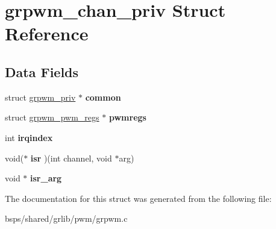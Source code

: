 \hypertarget{structgrpwm__chan__priv}{}\section{grpwm\+\_\+chan\+\_\+priv Struct Reference}
\label{structgrpwm__chan__priv}
\subsection*{Data Fields}
\begin{DoxyCompactItemize}
\item 
\mbox{\label{structgrpwm__chan__priv_a6a0ea36782dfaaa1511485ef8dd62f4c}} 
struct \mbox{\hyperlink{structgrpwm__priv}{grpwm\+\_\+priv}} $\ast$ {\bfseries common}
\item 
\mbox{\label{structgrpwm__chan__priv_a534d1915514917f64ddaeca3adf753cb}} 
struct \mbox{\hyperlink{structgrpwm__pwm__regs}{grpwm\+\_\+pwm\+\_\+regs}} $\ast$ {\bfseries pwmregs}
\item 
\mbox{\label{structgrpwm__chan__priv_a52384ea31860b676b1d50fc49df7aefc}} 
int {\bfseries irqindex}
\item 
\mbox{\label{structgrpwm__chan__priv_a795761b1f013ecbbeb27df66c45c725e}} 
void($\ast$ {\bfseries isr} )(int channel, void $\ast$arg)
\item 
\mbox{\label{structgrpwm__chan__priv_a7bc8a6b03853eba5538dec8419a170bf}} 
void $\ast$ {\bfseries isr\+\_\+arg}
\end{DoxyCompactItemize}


The documentation for this struct was generated from the following file\+:\begin{DoxyCompactItemize}
\item 
bsps/shared/grlib/pwm/grpwm.\+c\end{DoxyCompactItemize}
